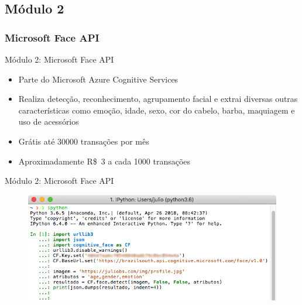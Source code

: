 \subsection{Módulo 2}

\subsubsection{Microsoft Face API}

\begin{frame}{Módulo 2: Microsoft Face API}
\begin{itemize}
    \item Parte do Microsoft Azure Cognitive Services
    \item Realiza detecção, reconhecimento, agrupamento facial e extrai diversas outras características como emoção, idade, sexo, cor do cabelo, barba, maquiagem e uso de acessórios
    \item Grátis até 30000 transações por mês
    \item Aproximadamente R\$~3 a cada 1000 transações
\end{itemize}
\end{frame}

\begin{frame}{Módulo 2: Microsoft Face API}
\begin{figure}[htbp]
    \label{fig:face_api_test1}
    \centering
    \includegraphics[height=0.8\textheight,width=\textwidth,keepaspectratio]{imagens/msft_face_api_json_1.png}
\end{figure}
\end{frame}


